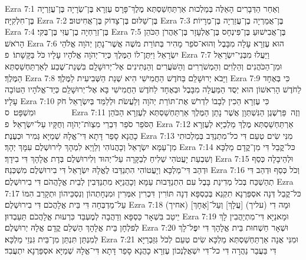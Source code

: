 Ezra 7:1	וְאַחַר הַדְּבָרִים הָאֵלֶּה בְּמַלְכוּת אַרְתַּחְשַׁסְתְּא מֶלֶךְ־פָּרָס עֶזְרָא בֶּן־שְׂרָיָה בֶּן־עֲזַרְיָה בֶּן־חִלְקִיָּה׃
Ezra 7:2	בֶּן־שַׁלּוּם בֶּן־צָדוֹק בֶּן־אֲחִיטוּב׃
Ezra 7:3	בֶּן־אֲמַרְיָה בֶן־עֲזַרְיָה בֶּן־מְרָיוֹת׃
Ezra 7:4	בֶּן־זְרַחְיָה בֶן־עֻזִּי בֶּן־בֻּקִּי׃
Ezra 7:5	בֶּן־אֲבִישׁוּעַ בֶּן־פִּינְחָס בֶּן־אֶלְעָזָר בֶּן־אַהֲרֹן הַכֹּהֵן הָרֹאשׁ׃
Ezra 7:6	הוּא עֶזְרָא עָלָה מִבָּבֶל וְהוּא־סֹפֵר מָהִיר בְּתוֹרַת מֹשֶׁה אֲשֶׁר־נָתַן יְהֹוָה אֱלֹהֵי יִשְׂרָאֵל וַיִּתֶּן־לוֹ הַמֶּלֶךְ כְּיַד־יְהֹוָה אֱלֹהָיו עָלָיו כֹּל בַּקָּשָׁתוֹ׃ {פ}
Ezra 7:7	וַיַּעֲלוּ מִבְּנֵי־יִשְׂרָאֵל וּמִן־הַכֹּהֲנִים וְהַלְוִיִּם וְהַמְשֹׁרְרִים וְהַשֹּׁעֲרִים וְהַנְּתִינִים אֶל־יְרוּשָׁלָ͏ִם בִּשְׁנַת־שֶׁבַע לְאַרְתַּחְשַׁסְתְּא הַמֶּלֶךְ׃
Ezra 7:8	וַיָּבֹא יְרוּשָׁלַ͏ִם בַּחֹדֶשׁ הַחֲמִישִׁי הִיא שְׁנַת הַשְּׁבִיעִית לַמֶּלֶךְ׃
Ezra 7:9	כִּי בְּאֶחָד לַחֹדֶשׁ הָרִאשׁוֹן הוּא יְסֻד הַמַּעֲלָה מִבָּבֶל וּבְאֶחָד לַחֹדֶשׁ הַחֲמִישִׁי בָּא אֶל־יְרוּשָׁלַ͏ִם כְּיַד־אֱלֹהָיו הַטּוֹבָה עָלָיו׃
Ezra 7:10	כִּי עֶזְרָא הֵכִין לְבָבוֹ לִדְרֹשׁ אֶת־תּוֹרַת יְהֹוָה וְלַעֲשֹׂת וּלְלַמֵּד בְּיִשְׂרָאֵל חֹק וּמִשְׁפָּט׃ {ס}        
Ezra 7:11	וְזֶה  פַּרְשֶׁגֶן הַנִּשְׁתְּוָן אֲשֶׁר נָתַן הַמֶּלֶךְ אַרְתַּחְשַׁסְתְּא לְעֶזְרָא הַכֹּהֵן הַסֹּפֵר סֹפֵר דִּבְרֵי מִצְוֺת־יְהֹוָה וְחֻקָּיו עַל־יִשְׂרָאֵל׃ {פ}
Ezra 7:12	אַרְתַּחְשַׁסְתְּא מֶלֶךְ מַלְכַיָּא לְעֶזְרָא כָהֲנָא סָפַר דָּתָא דִּי־אֱלָהּ שְׁמַיָּא גְּמִיר וּכְעֶנֶת׃
Ezra 7:13	מִנִּי שִׂים טְעֵם דִּי כל־מִתְנַדַּב בְּמַלְכוּתִי מִן־עַמָּא יִשְׂרָאֵל וְכָהֲנוֹהִי וְלֵוָיֵא לִמְהָךְ לִירוּשְׁלֶם עִמָּךְ יְהָךְ׃
Ezra 7:14	כּל־קֳבֵל דִּי מִן־קֳדָם מַלְכָּא וְשִׁבְעַת יָעֲטֹהִי שְׁלִיחַ לְבַקָּרָה עַל־יְהוּד וְלִירוּשְׁלֶם בְּדָת אֱלָהָךְ דִּי בִידָךְ׃
Ezra 7:15	וּלְהֵיבָלָה כְּסַף וּדְהַב דִּי־מַלְכָּא וְיָעֲטוֹהִי הִתְנַדַּבוּ לֶאֱלָהּ יִשְׂרָאֵל דִּי בִירוּשְׁלֶם מִשְׁכְּנֵהּ׃
Ezra 7:16	וְכֹל כְּסַף וּדְהַב דִּי תְהַשְׁכַּח בְּכֹל מְדִינַת בָּבֶל עִם הִתְנַדָּבוּת עַמָּא וְכָהֲנַיָּא מִתְנַדְּבִין לְבֵית אֱלָהֲהֹם דִּי בִירוּשְׁלֶם׃
Ezra 7:17	כּל־קֳבֵל דְּנָה אסְפַּרְנָא תִקְנֵא בְּכַסְפָּא דְנָה תּוֹרִין  דִּכְרִין אִמְּרִין וּמִנְחָתְהוֹן וְנִסְכֵּיהוֹן וּתְקָרֵב הִמּוֹ עַל־מַדְבְּחָה דִּי בֵּית אֱלָהֲכֹם דִּי בִירוּשְׁלֶם׃
Ezra 7:18	וּמָה דִי (עליך) [עֲלָךְ] וְעַל־[אֶחָךְ] (אחיך) יֵיטַב בִּשְׁאָר כַּסְפָּא וְדַהֲבָה לְמֶעְבַּד כִּרְעוּת אֱלָהֲכֹם תַּעַבְדוּן׃
Ezra 7:19	וּמָאנַיָּא דִּי־מִתְיַהֲבִין לָךְ לְפלְחָן בֵּית אֱלָהָךְ הַשְׁלֵם קֳדָם אֱלָהּ יְרוּשְׁלֶם׃
Ezra 7:20	וּשְׁאָר חַשְׁחוּת בֵּית אֱלָהָךְ דִּי יִפֶּל־לָךְ לְמִנְתַּן תִּנְתֵּן מִן־בֵּית גִּנְזֵי מַלְכָּא׃
Ezra 7:21	וּמִנִּי אֲנָה אַרְתַּחְשַׁסְתְּא מַלְכָּא שִׂים טְעֵם לְכֹל גִּזַּבְרַיָּא דִּי בַּעֲבַר נַהֲרָה דִּי כל־דִּי יִשְׁאֲלֶנְכוֹן עֶזְרָא כָהֲנָא סָפַר דָּתָא דִּי־אֱלָהּ שְׁמַיָּא אסְפַּרְנָא יִתְעֲבִד׃
